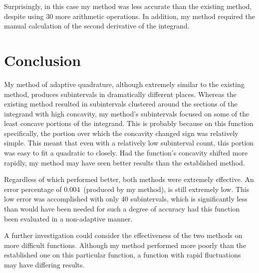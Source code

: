 \documentclass{paper}
\begin{document}
Surprisingly, in this case my method was less accurate than the existing method, despite using 30 more arithmetic operations.
In addition, my method required the manual calculation of the second derivative of the integrand.

\section{Conclusion}
\label{sec:conclusion}
My method of adaptive quadrature, although extremely similar to the existing method, produces subintervals in dramatically different places.
Whereas the existing method resulted in subintervals clustered around the sections of the integrand with high concavity, my method's subintervals focused on some of the least concave portions of the integrand.
This is probably because on this function specifically, the portion over which the concavity changed sign was relatively simple.
This meant that even with a relatively low subinterval count, this portion was easy to fit a quadratic to closely.
Had the function's concavity shifted more rapidly, my method may have seen better results than the established method.

Regardless of which performed better, both methods were extremely effective. An error percentage of \(0.004\)~(produced by my method), is still extremely low.
This low error was accomplished with only 40 subintervals, which is significantly less than would have been needed for such a degree of accuracy had this function been evaluated in a non-adaptive manner.

A further investigation could consider the effectiveness of the two methods on more difficult functions.
Although my method performed more poorly than the established one on this particular function, a function with rapid fluctuations may have differing results.
\label{mylastpage}
\newpage
{}
\listoffigures
\vspace{1cm}
\listofsnippets
\vspace{1cm}
{}
\printbibliography
\thispagestyle{frontorback}
\end{document}
